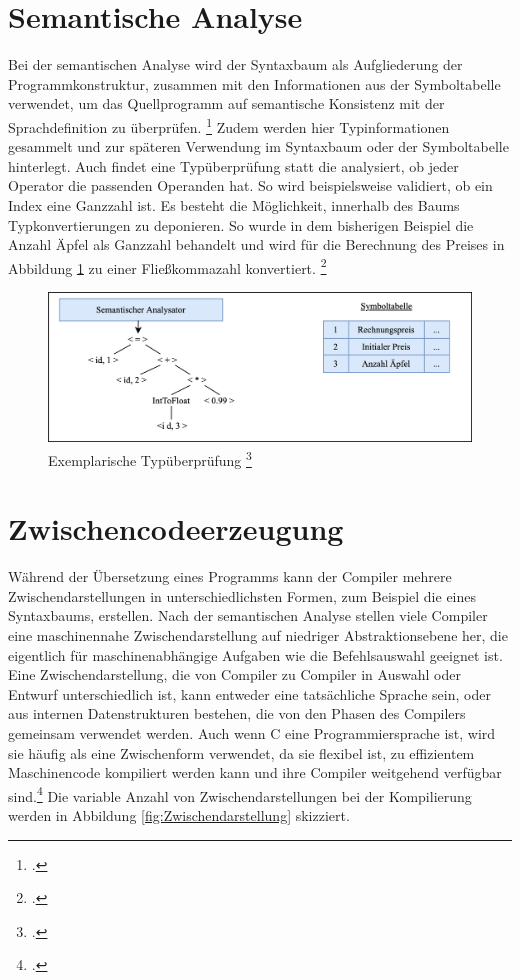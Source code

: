 \section{Semantische Analyse}

Bei der semantischen Analyse wird der Syntaxbaum    als Aufgliederung der Programmkonstruktur,  zusammen mit den Informationen aus der Symboltabelle verwendet,  um das Quellprogramm auf semantische Konsistenz mit der Sprachdefinition zu überprüfen. \footcite[Vgl.][S. 157]{Wilhelm2012} Zudem werden hier Typinformationen gesammelt und zur späteren Verwendung im Syntaxbaum oder der Symboltabelle hinterlegt.  Auch findet eine Typüberprüfung statt die analysiert, ob jeder Operator die passenden Operanden hat.  So wird beispielsweise validiert,  ob ein Index eine Ganzzahl ist.  Es besteht die Möglichkeit, innerhalb des Baums Typkonvertierungen zu deponieren.  So wurde in dem bisherigen Beispiel die Anzahl Äpfel als Ganzzahl behandelt und wird für die Berechnung des Preises in Abbildung \ref{fig:Typ} zu einer Fließkommazahl konvertiert. \footcite[Vgl.][S. 9ff]{Ullmann2008}

\begin{figure}[!ht]
 \includegraphics[width=\textwidth,keepaspectratio]{Images/Compiler/Type.png}
 \caption[Exemplarische Typüberprüfung]{Exemplarische Typüberprüfung \protect\footcite{Ullmann2008} }
 \label{fig:Typ}
\end{figure}
\section{Zwischencodeerzeugung}
Während der Übersetzung eines Programms  kann der Compiler mehrere Zwischendarstellungen in unterschiedlichsten Formen,  zum Beispiel die eines Syntaxbaums, erstellen.  
Nach der semantischen Analyse stellen viele Compiler eine maschinennahe Zwischendarstellung auf niedriger Abstraktionsebene her, die eigentlich für maschinenabhängige Aufgaben wie die Befehlsauswahl geeignet ist.  Eine Zwischendarstellung, die von Compiler zu Compiler in Auswahl oder Entwurf unterschiedlich ist,  kann entweder eine tatsächliche Sprache sein,  oder aus internen Datenstrukturen bestehen, die von den Phasen des Compilers gemeinsam verwendet werden. Auch wenn C eine Programmiersprache ist, wird sie häufig als eine Zwischenform verwendet, da sie flexibel ist, zu effizientem Maschinencode kompiliert werden kann und ihre Compiler weitgehend verfügbar sind.\footcite[Vgl.][S. 433]{Ullmann2008} Die variable Anzahl von Zwischendarstellungen bei der Kompilierung werden in Abbildung \ref{fig:Zwischendarstellung} skizziert.


